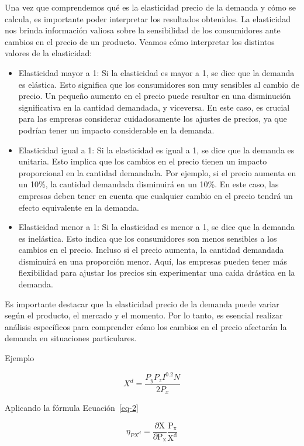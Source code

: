 \documentclass[
  a4paper,
]{article}
\begin{document}
Una vez que comprendemos qué es la elasticidad precio de la demanda y
cómo se calcula, es importante poder interpretar los resultados
obtenidos. La elasticidad nos brinda información valiosa sobre la
sensibilidad de los consumidores ante cambios en el precio de un
producto. Veamos cómo interpretar los distintos valores de la
elasticidad:

\begin{itemize}
\item
  Elasticidad mayor a 1: Si la elasticidad es mayor a 1, se dice que la
  demanda es elástica. Esto significa que los consumidores son muy
  sensibles al cambio de precio. Un pequeño aumento en el precio puede
  resultar en una disminución significativa en la cantidad demandada, y
  viceversa. En este caso, es crucial para las empresas considerar
  cuidadosamente los ajustes de precios, ya que podrían tener un impacto
  considerable en la demanda.
\item
  Elasticidad igual a 1: Si la elasticidad es igual a 1, se dice que la
  demanda es unitaria. Esto implica que los cambios en el precio tienen
  un impacto proporcional en la cantidad demandada. Por ejemplo, si el
  precio aumenta en un 10\%, la cantidad demandada disminuirá en un
  10\%. En este caso, las empresas deben tener en cuenta que cualquier
  cambio en el precio tendrá un efecto equivalente en la demanda.
\item
  Elasticidad menor a 1: Si la elasticidad es menor a 1, se dice que la
  demanda es inelástica. Esto indica que los consumidores son menos
  sensibles a los cambios en el precio. Incluso si el precio aumenta, la
  cantidad demandada disminuirá en una proporción menor. Aquí, las
  empresas pueden tener más flexibilidad para ajustar los precios sin
  experimentar una caída drástica en la demanda.
\end{itemize}

Es importante destacar que la elasticidad precio de la demanda puede
variar según el producto, el mercado y el momento. Por lo tanto, es
esencial realizar análisis específicos para comprender cómo los cambios
en el precio afectarán la demanda en situaciones particulares.

Ejemplo

\[
X^d = \frac{P_y P_z I^{0.2} N}{2 P_x}
\]

Aplicando la fórmula Ecuación~\ref{eq-2}

\[ 
\eta _{PX^d} = \frac{\partial \mathrm{X}}{\partial \mathrm{P_x}} \frac{\mathrm{P_x}}{\mathrm{X^d}} 
\]
\end{document}
